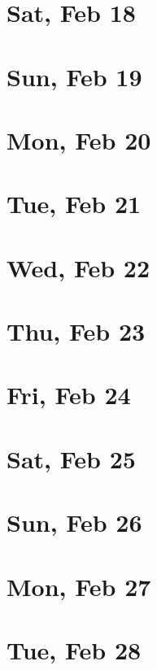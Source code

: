 	\section{Sat, Feb 18}
		
		
	\section{Sun, Feb 19}
		
		
	\section{Mon, Feb 20}
		
		
	\section{Tue, Feb 21}
		
		
	\section{Wed, Feb 22}
		
		
	\section{Thu, Feb 23}
		
		
	\section{Fri, Feb 24}
		
		
	\section{Sat, Feb 25}
		
		
	\section{Sun, Feb 26}
		
		
	\section{Mon, Feb 27}
		
		
	\section{Tue, Feb 28}
		
		
